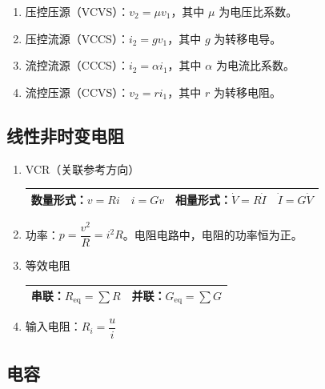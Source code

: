 \documentclass[UTF8,fontset=fandol,zihao=5]{ctexart}
\begin{document}
\begin{enumerate}
  \item 压控压源（VCVS）：\(v_2=\mu v_1\)，其中 \(\mu\) 为电压比系数。
  \item 压控流源（VCCS）：\(i_2=gv_1\)，其中 \(g\) 为转移电导。
  \item 流控流源（CCCS）：\(i_2=\alpha i_1\)，其中 \(\alpha\) 为电流比系数。
  \item 流控压源（CCVS）：\(v_2=ri_1\)，其中 \(r\) 为转移电阻。
\end{enumerate}

\subsection{线性非时变电阻}

\begin{enumerate}
  \item VCR（关联参考方向）

  \begin{center}
    \begin{tabularx}{0.92\textwidth}{XX}
      \toprule
      数量形式：\(v=Ri\quad i=Gv\) & 相量形式：\(\dot V=R\dot I\quad \dot I=G\dot V\) \\
      \bottomrule
    \end{tabularx}
  \end{center}

  \item 功率：\(p=\dfrac{v^2}{R}=i^2R\)。电阻电路中，电阻的功率恒为正。

  \item 等效电阻

  \begin{center}
    \begin{tabularx}{0.92\textwidth}{XX}
      \toprule
      串联：\(R_{\mathrm{eq}}=\displaystyle\sum R\) & 并联：\(G_{\mathrm{eq}}=\displaystyle\sum G\) \\
      \bottomrule
    \end{tabularx}
  \end{center}

  \item 输入电阻：\(R_i=\dfrac{u}{i}\)
\end{enumerate}

\subsection{电容}
\end{document}
